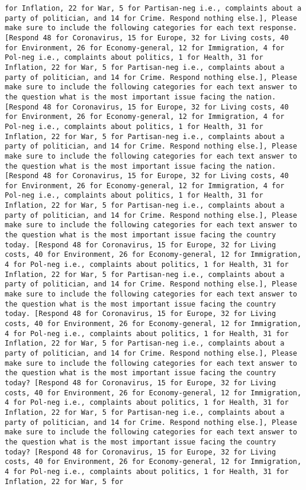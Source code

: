 \begin{lstlisting}[label=lst:poor_performing_prompts]
for Inflation, 22 for War, 5 for Partisan-neg i.e., complaints about a party of politician, and 14 for Crime. Respond nothing else.], Please make sure to include the following categories for each text response. [Respond 48 for Coronavirus, 15 for Europe, 32 for Living costs, 40 for Environment, 26 for Economy-general, 12 for Immigration, 4 for Pol-neg i.e., complaints about politics, 1 for Health, 31 for Inflation, 22 for War, 5 for Partisan-neg i.e., complaints about a party of politician, and 14 for Crime. Respond nothing else.], Please make sure to include the following categories for each text answer to the question what is the most important issue facing the nation. [Respond 48 for Coronavirus, 15 for Europe, 32 for Living costs, 40 for Environment, 26 for Economy-general, 12 for Immigration, 4 for Pol-neg i.e., complaints about politics, 1 for Health, 31 for Inflation, 22 for War, 5 for Partisan-neg i.e., complaints about a party of politician, and 14 for Crime. Respond nothing else.], Please make sure to include the following categories for each text answer to the question what is the most important issue facing the nation. [Respond 48 for Coronavirus, 15 for Europe, 32 for Living costs, 40 for Environment, 26 for Economy-general, 12 for Immigration, 4 for Pol-neg i.e., complaints about politics, 1 for Health, 31 for Inflation, 22 for War, 5 for Partisan-neg i.e., complaints about a party of politician, and 14 for Crime. Respond nothing else.], Please make sure to include the following categories for each text answer to the question what is the most important issue facing the country today. [Respond 48 for Coronavirus, 15 for Europe, 32 for Living costs, 40 for Environment, 26 for Economy-general, 12 for Immigration, 4 for Pol-neg i.e., complaints about politics, 1 for Health, 31 for Inflation, 22 for War, 5 for Partisan-neg i.e., complaints about a party of politician, and 14 for Crime. Respond nothing else.], Please make sure to include the following categories for each text answer to the question what is the most important issue facing the country today. [Respond 48 for Coronavirus, 15 for Europe, 32 for Living costs, 40 for Environment, 26 for Economy-general, 12 for Immigration, 4 for Pol-neg i.e., complaints about politics, 1 for Health, 31 for Inflation, 22 for War, 5 for Partisan-neg i.e., complaints about a party of politician, and 14 for Crime. Respond nothing else.], Please make sure to include the following categories for each text answer to the question what is the most important issue facing the country today? [Respond 48 for Coronavirus, 15 for Europe, 32 for Living costs, 40 for Environment, 26 for Economy-general, 12 for Immigration, 4 for Pol-neg i.e., complaints about politics, 1 for Health, 31 for Inflation, 22 for War, 5 for Partisan-neg i.e., complaints about a party of politician, and 14 for Crime. Respond nothing else.], Please make sure to include the following categories for each text answer to the question what is the most important issue facing the country today? [Respond 48 for Coronavirus, 15 for Europe, 32 for Living costs, 40 for Environment, 26 for Economy-general, 12 for Immigration, 4 for Pol-neg i.e., complaints about politics, 1 for Health, 31 for Inflation, 22 for War, 5 for 
\end{lstlisting}
